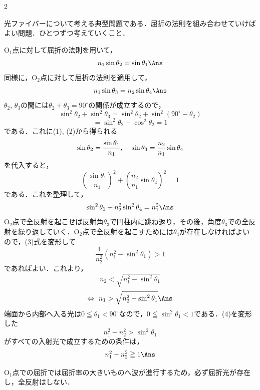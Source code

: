 \begin{multicols}{2}
\par\nopagebreak
\begin{sisin}
光ファイバーについて考える典型問題である．屈折の法則を組み合わせていけばよい問題．ひとつずつ考えていくこと．
\end{sisin}
\KaiHead
\begin{komon}
 $\mathrm{O_1}$点に対して屈折の法則を用いて，
       \[n_1\sin\theta_2=\sin\theta_1\Ans\]
 同様に，$\mathrm{O_2}$点に対して屈折の法則を適用して，
       \[n_1\sin\theta_3=n_2\sin\theta_4\Ans\]
 $\theta_2$, $\theta_3$の間には$\theta_2+\theta_3=90^\circ$の関係が成立するので，
       \[\sin^2\theta_2+\sin^2\theta_3=\sin^2\theta_2+\sin^2(90^\circ-\theta_2)\]
       \[=\sin^2\theta_2+\cos^2\theta_2=1\]
       である．これに(1), (2)から得られる
       \[\sin\theta_2=\frac{\sin\theta_1}{n_1},\hspace{4mm}\sin\theta_3=\frac{n_2}{n_1}\sin\theta_4\]
       を代入すると，
       \[\left(\frac{\sin\theta_1}{n_1}\right)^2+\left(\frac{n_2}{n_1}\sin\theta_4\right)^2=1\]
       である．これを整理して，
       \[\sin^2\theta_1+n_2^2\sin^2\theta_4=n_1^2\Ans\]
 $\mathrm{O_2}$点で全反射を起こせば反射角$\theta_3$で円柱内に跳ね返り，その後，角度$\theta_3$での全反射を繰り返していく．$\mathrm{O_2}$点で全反射を起こすためには$\theta_4$が存在しなければよいので，(3)式を変形して
       \[\frac{1}{n_2^2}\left(n_1^2-\sin^2\theta_1\right)>1\]
       であればよい．これより，
       \[n_2<\sqrt{n_1^2-\sin^2\theta_1}\]
       \[\Leftrightarrow\ n_1>\sqrt{n_2^2+\sin^2\theta_1}\Ans\]
 端面から内部へ入る光は$0\leqq\theta_1<90^\circ$なので，$0\leqq\sin^2\theta_1<1$である．(4)を変形した
       \[n_1^2-n_2^2>\sin^2\theta_1\]
       がすべての入射光で成立するための条件は，
       \[n_1^2-n_2^2\geqq 1\Ans\]
\end{komon}
\begin{chuu}
$\mathrm{O_1}$点での屈折では屈折率の大きいものへ波が進行するため，必ず屈折光が存在し，全反射はしない．
\end{chuu}



\end{multicols}

